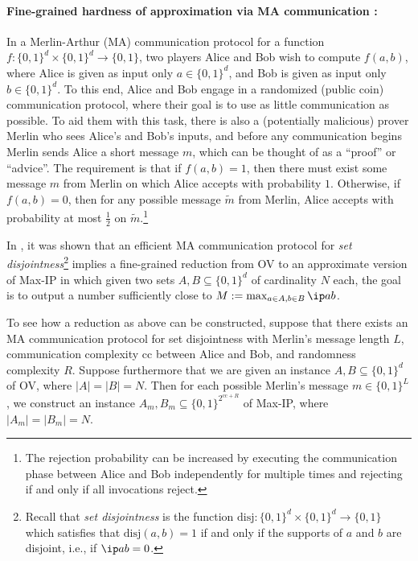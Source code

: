 \documentclass[11pt]{article}
\theoremstyle{plain}
\theoremstyle{remark}
\newcommand{\cc}{\mathrm{cc}}
\begin{document}
\paragraph{Fine-grained hardness of approximation via MA communication \cite{ARW17}:}  In a Merlin-Arthur (MA) communication protocol for a function $f: \{0,1\}^d \times \{0,1\}^d \to \{0,1\}$, two players
Alice and Bob wish to compute
$f(a,b)$, where Alice is given as input only
$a \in\{0,1\}^d$, and Bob is given as input only $b \in \{0,1\}^d$.
To this end, Alice and Bob engage in a randomized (public coin) communication protocol, where their goal is to use as little communication as possible. 
To aid them with this task, there is also  a (potentially malicious)
prover Merlin who sees Alice's and Bob's inputs, and before any communication
begins Merlin sends Alice a short message $m$, which can be thought of as a ``proof'' or ``advice''. 
The requirement is that if $f(a,b)=1$, then there must exist
some message $m$ from Merlin on which Alice accepts with probability
$1$. Otherwise, if $f(a,b)=0$, then for any possible message $\tilde m$ from Merlin, Alice accepts with probability
at most $\frac 12$ on $\tilde m$.\footnote{The rejection probability can be increased by executing the communication phase between Alice and Bob independently for multiple times and rejecting if and only if all invocations reject.} 

In \cite{ARW17}, it was shown that an efficient MA communication protocol for \emph{set disjointness}\footnote{Recall that \emph{set disjointness} is the function $\mathrm{disj}:\{0,1\}^d \times \{0,1\}^d \to \{0,1\}$ which satisfies that $
\mathrm{disj}(a,b)=1$ if and only if the supports of $a$ and $b$ are disjoint, i.e., if $\ip a b =0$.} implies a fine-grained reduction from OV to an approximate version of Max-IP in which given two sets $A, B\subseteq\{0,1\}^d$ of cardinality $N$ each, the goal is to output a number sufficiently close to $M:=\max_{a \in A, b \in B} \ip a b$.

To see how a reduction as above can be constructed, suppose that there exists an MA communication protocol for set disjointness with Merlin's message length $L$, communication complexity $\cc$ between Alice and Bob, and randomness complexity $R$. Suppose furthermore that we are given an instance $A,B \subseteq \{0,1\}^d$ of OV, where $|A|=|B|=N$. Then for each possible Merlin's message $m \in \{0,1\}^L$, we construct an instance $A_m,B_m \subseteq \{0,1\}^{ 2^{\cc+R} }$ of Max-IP, where $|A_m| = |B_m|=N$.
\end{document}

